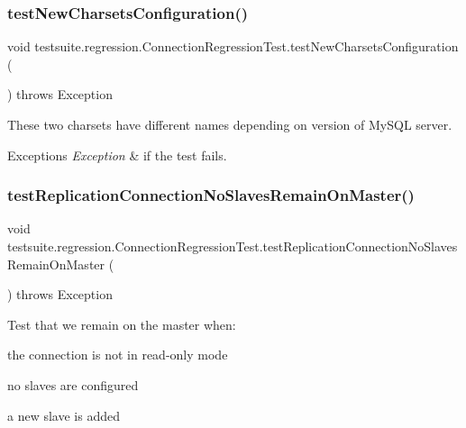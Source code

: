 \subsubsection{\texorpdfstring{test\+New\+Charsets\+Configuration()}{testNewCharsetsConfiguration()}}
{\footnotesize\ttfamily void testsuite.\+regression.\+Connection\+Regression\+Test.\+test\+New\+Charsets\+Configuration (\begin{DoxyParamCaption}{ }\end{DoxyParamCaption}) throws Exception}

These two charsets have different names depending on version of My\+S\+QL server.


\begin{DoxyExceptions}{Exceptions}
{\em Exception} & if the test fails. \\
\hline
\end{DoxyExceptions}
\mbox{\label{classtestsuite_1_1regression_1_1_connection_regression_test_a83ad61ca50bf84278212939dd4caff44}} 
\subsubsection{\texorpdfstring{test\+Replication\+Connection\+No\+Slaves\+Remain\+On\+Master()}{testReplicationConnectionNoSlavesRemainOnMaster()}}
{\footnotesize\ttfamily void testsuite.\+regression.\+Connection\+Regression\+Test.\+test\+Replication\+Connection\+No\+Slaves\+Remain\+On\+Master (\begin{DoxyParamCaption}{ }\end{DoxyParamCaption}) throws Exception}

Test that we remain on the master when\+:
\begin{DoxyItemize}
\item the connection is not in read-\/only mode
\item no slaves are configured
\item a new slave is added 
\end{DoxyItemize}\mbox{\label{classtestsuite_1_1regression_1_1_connection_regression_test_ae79808e3889aec702379cc6fe4163e22}} 
